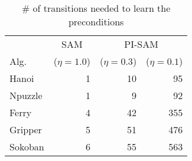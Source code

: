 \documentclass[letterpaper]{article} %
\begin{document}
\begin{table}[b]
\centering
{}
\caption{Results on Blocks with $\eta = 0.3$.}
\label{tab:results1}
\end{table}

\begin{table}
\centering
\begin{tabular}{@{}l|r|rr@{}}
\toprule
    & \multicolumn{1}{c}{SAM} & \multicolumn{2}{c}{PI-SAM} \\ 
Alg.     & ($\eta=1.0$) & ($\eta=0.3$)    & ($\eta=0.1$)    \\ \midrule
Hanoi   & 1   & 10     & 95     \\
Npuzzle & 1   & 9      & 92     \\
Ferry   & 4   & 42     & 355    \\
Gripper & 5   & 51     & 476    \\
Sokoban & 6   & 55     & 563    \\ \bottomrule
\end{tabular}
\caption{\# of transitions needed to learn the preconditions}
\label{tab:results2}
\end{table}
\end{document}
